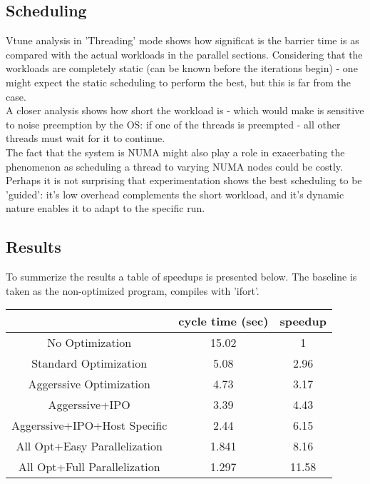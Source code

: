 \subsection*{Scheduling}
Vtune analysis in 'Threading' mode shows
how significat is the barrier time is as 
compared with the actual workloads in the parallel sections.
Considering that the workloads are completely
static (can be known before the iterations begin) -
one might expect the static scheduling
to perform the best, but this is far from the case.\\

A closer analysis shows how short the workload is - 
which would make is sensitive to noise preemption by the OS:
if one of the threads is preempted -
all other threads must wait for it to continue.\\
The fact that the system is NUMA might also play a
role in exacerbating the phenomenon as scheduling a thread
to varying NUMA nodes could be costly.\\
Perhaps it is not surprising that experimentation shows
the best scheduling to be 'guided':
it's low overhead complements the short workload,
and it's dynamic nature enables it to adapt to 
the specific run.

\subsection*{Results}
To summerize the results a table of speedups is presented below.
The baseline is taken as the non-optimized program, compiles with 'ifort'.
\begin{center}
\begin{tabular}{| c | c | c |}
    \hline
        & cycle time (sec) & speedup \\
    \hline
    No Optimization & 15.02 & 1 \\
    Standard Optimization & 5.08 & 2.96 \\
    Aggerssive Optimization & 4.73 & 3.17 \\
    Aggerssive+IPO & 3.39 & 4.43 \\
    Aggerssive+IPO+Host Specific & 2.44 & 6.15 \\
    \hline
    All Opt+Easy Parallelization & 1.841 & 8.16 \\
    All Opt+Full Parallelization & 1.297 & 11.58 \\
    \hline
\end{tabular}
\end{center}